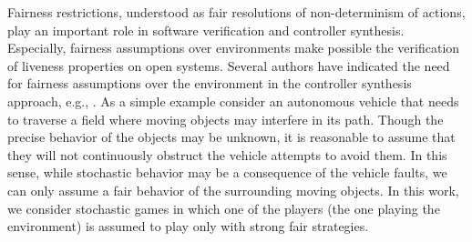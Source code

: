	Fairness restrictions, understood as fair resolutions of non-determinism of actions, play an important role in software verification and controller synthesis. 
	Especially, fairness assumptions over environments make possible the verification of liveness properties on open systems. 
	Several authors have indicated the need for fairness assumptions over the environment 
	in the controller synthesis approach, e.g., \cite{DBLP:conf/fossacs/AsarinCV10,DBLP:conf/icse/DIppolitoBPU11}.
        As a simple example consider an autonomous vehicle that needs to traverse a field where moving objects may interfere in its path.  Though the precise behavior of the objects may be unknown, it is reasonable to assume that they will not continuously obstruct the vehicle attempts to avoid them.  In this sense, while stochastic behavior may be a consequence of the vehicle faults, we can only assume a fair behavior of the surrounding moving objects.
        In this work, we consider stochastic games in which one of the players (the one playing the environment) is assumed to play only with strong fair strategies.
